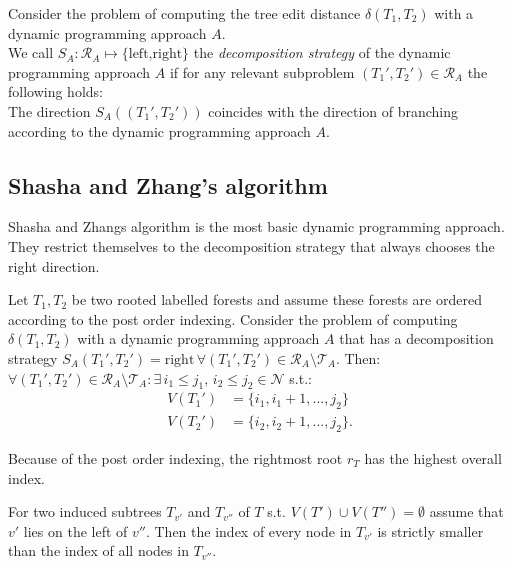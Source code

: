 \begin{defin}
Consider the problem of computing the tree edit distance $\delta(T_1,T_2)$ with a dynamic programming approach $A$.\\
We call $S_A : \mathcal{R}_A \mapsto \{\text{left,right}\}$ the \textit{decomposition strategy} of the dynamic programming approach $A$ if for any relevant subproblem  $(T_1',T_2') \in \mathcal{R}_A$ the following holds: \\
The direction $S_A((T_1',T_2'))$ coincides with the direction of branching according to the dynamic programming approach $A$.
\end{defin}


\subsection{Shasha and Zhang's algorithm}\label{sec:saz}
Shasha and Zhangs algorithm is the most basic dynamic programming approach. They restrict themselves to the decomposition strategy that always chooses the right direction. 
\begin{lem}\label{lem:sets}
Let $T_1,T_2$ be two rooted labelled forests and assume these forests are ordered according to the post order indexing. Consider the problem of computing  $\delta(T_1,T_2)$ with a dynamic programming approach $A$ that has a decomposition strategy $S_A(T_1',T_2') = \text{right} \, \forall (T_1',T_2') \in \mathcal{R}_A \setminus \mathcal{T}_A$. Then:\\
$\forall (T_1',T_2') \in \mathcal{R}_A \setminus \mathcal{T}_A : \exists \, i_1 \leq j_1,\, i_2 \leq j_2 \in \mathcal{N}$ s.t.:\\
 \begin{align*}
 V(T_1') &= \{i_1,i_1+1,...,j_2\} \\
 V(T_2') &= \{i_2,i_2+1,...,j_2\}.
 \end{align*}
\end{lem}
\begin{rem}[Remark 1]
Because of the post order indexing, the rightmost root $r_T$ has the highest overall index.
\end{rem}
\begin{rem}[Remark 2] 
For two induced subtrees $T_{v'}$ and $T_{v''}$ of $T$ s.t. $V(T') \cup V(T'') = \emptyset$ assume that $v'$ lies on the left of $v''$. Then the index of every node in $T_{v'}$ is strictly smaller than the index of all nodes in $T_{v''}$.
\end{rem}

